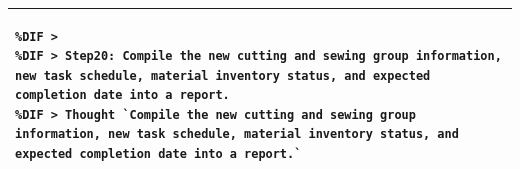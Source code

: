 \documentclass[preprint,12pt]{elsarticle}
\providecommand{\DIFmodend}{} %
\begin{document}
\begin{center}
\begin{longtable}{p{390pt}}
\begin{lstlisting}[style=my_operation, label={lst:chain_of_operation},alsolanguage=DIFcode]
%DIF > SQL `SELECT pm.material_id, pm.number, wm.left_number FROM product_material pm JOIN warehouse_material wm ON pm.material_id = wm.material_id WHERE pm.product_id IN (SELECT product_id FROM order_product WHERE order_id = 3);`
%DIF > 
%DIF > Step20: Compile the new cutting and sewing group information, new task schedule, material inventory status, and expected completion date into a report.
%DIF > Thought `Compile the new cutting and sewing group information, new task schedule, material inventory status, and expected completion date into a report.`
\end{lstlisting}
\DIFmodend\\ %
\hline
\end{longtable}
\end{center}
\end{document}

